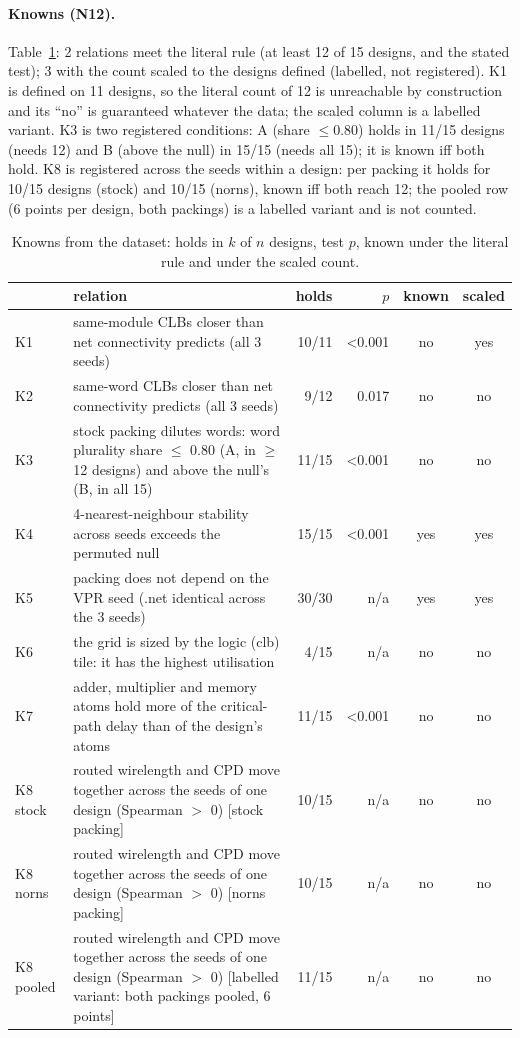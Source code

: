 \paragraph{Knowns (N12).} Table~\ref{tab:r4knowns}: 2 relations meet the literal rule (at least 12 of 15 designs, and the stated test);
3 with the count scaled to the designs defined (labelled, not registered). K1 is defined on 11 designs, so the literal count of 12 is unreachable by construction and its ``no'' is guaranteed whatever the data; the scaled column is a labelled variant. K3 is two registered conditions: A (share $\le0.80$) holds in 11/15 designs (needs 12) and B (above the null) in 15/15 (needs all 15); it is known iff both hold. K8 is registered across the seeds within a design: per packing it holds for 10/15 designs (stock) and 10/15 (norns), known iff both reach 12; the pooled row (6 points per design, both packings) is a labelled variant and is not counted.
\begin{table}[t]
\caption{Knowns from the dataset: holds in $k$ of $n$ designs, test $p$, known under the literal rule and under the scaled count.}
\label{tab:r4knowns}
\centering\scriptsize\setlength{\tabcolsep}{3pt}
\begin{tabular}{@{}lp{10.5cm}rrcc@{}}
\toprule
 & relation & holds & $p$ & known & scaled \\
\midrule
K1 & same-module CLBs closer than net connectivity predicts (all 3 seeds) & 10/11 & <0.001 & no & yes \\
K2 & same-word CLBs closer than net connectivity predicts (all 3 seeds) & 9/12 & 0.017 & no & no \\
K3 & stock packing dilutes words: word plurality share $\le$ 0.80 (A, in $\ge$ 12 designs) and above the null's (B, in all 15) & 11/15 & <0.001 & no & no \\
K4 & 4-nearest-neighbour stability across seeds exceeds the permuted null & 15/15 & <0.001 & yes & yes \\
K5 & packing does not depend on the VPR seed (.net identical across the 3 seeds) & 30/30 & n/a & yes & yes \\
K6 & the grid is sized by the logic (clb) tile: it has the highest utilisation & 4/15 & n/a & no & no \\
K7 & adder, multiplier and memory atoms hold more of the critical-path delay than of the design's atoms & 11/15 & <0.001 & no & no \\
K8 stock & routed wirelength and CPD move together across the seeds of one design (Spearman $>$ 0) [stock packing] & 10/15 & n/a & no & no \\
K8 norns & routed wirelength and CPD move together across the seeds of one design (Spearman $>$ 0) [norns packing] & 10/15 & n/a & no & no \\
K8 pooled & routed wirelength and CPD move together across the seeds of one design (Spearman $>$ 0) [labelled variant: both packings pooled, 6 points] & 11/15 & n/a & no & no \\
\bottomrule
\end{tabular}
\end{table}

